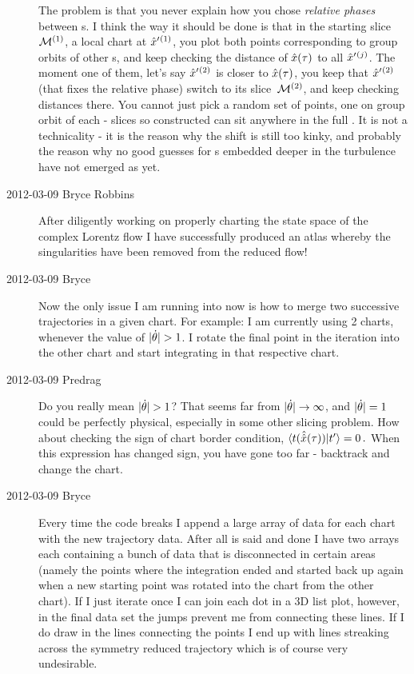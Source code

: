 \begin{description}
    The problem is that you never explain how you chose \emph{relative
    phases} between \template s. I think the way it should be done is
    that in the starting slice\ ${\cal M}{}^{(1)}$, a local chart at
    ${\hat{x}'}{}^{(1)}$, you plot both points corresponding to group orbits
    of other \template s, and keep checking the distance of
    $\hat{x}(\tau)$ to all ${\hat{x}'}{}^{(j)}$. The moment one of them,
    let's say ${\hat{x}'}{}^{(2)}$ is closer to $\hat{x}(\tau)$, you keep
    that ${\hat{x}'}{}^{(2)}$ (that fixes the relative phase) switch to its
    slice\ ${\cal M}{}^{(2)}$, and keep checking distances there. You cannot
    just pick a random set of points, one on group orbit of each
    {\template} - slices so constructed can sit anywhere in the full
    \statesp. It is not a technicality - it is the reason why the shift
    is still too kinky, and probably the reason why no good guesses for
    \rpo s embedded deeper in the turbulence have not emerged as yet.

\item[2012-03-09 Bryce Robbins]
After diligently working on properly charting the state space of the
complex Lorentz flow I have successfully produced an atlas whereby the
singularities have been removed from the reduced flow!

\item[2012-03-09 Bryce]
Now the only issue I am running into now is how to merge two successive
trajectories in a given chart. For example: I am currently using 2
charts, whenever the value of  $|\dot{\gSpace}|>1$.  I rotate the final
point in the iteration into the other chart and start integrating in that
respective chart.

\item[2012-03-09 Predrag]
Do you really mean  $|\dot{\gSpace}|>1$? That seems far from $|\dot{\theta}|
\to \infty$, and $|\dot{\theta}|=1$ could be perfectly physical, especially
in some other slicing problem. How about checking the sign of chart
border condition,
\(
\langle{t(\hat{\ensuremath{\hat{x}}}(\ensuremath{\tau}))}\vphantom{ }|\vphantom{}t'\rangle= 0
\,.
\)
When this expression has changed sign, you have gone too far - backtrack
and change the chart.

\item[2012-03-09 Bryce]
Every time the code breaks I append a large array of data for each chart
with the new trajectory data. After all is said and done I have two
arrays each containing a bunch of data that is disconnected in certain
areas (namely the points where the integration ended and started back up
again when a new starting point was rotated into the chart from the other
chart). If I just iterate once I can join each dot in a 3D list plot,
however, in the final data set the jumps prevent me from connecting these
lines. If I do draw in the lines connecting the points I end up with
lines streaking across the symmetry reduced trajectory which is of course
very undesirable.


\end{description}
